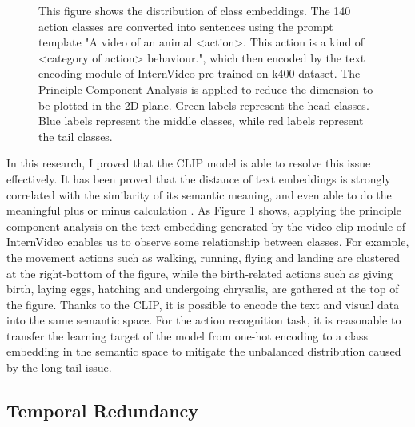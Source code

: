\begin{figure}[ht]
    \centering
    \caption[Class Embedding Distribution]{This figure shows the distribution of class embeddings. The 140 action classes are converted into sentences using the prompt template "A video of an animal <action>. This action is a kind of <category of action> behaviour.", which then encoded by the text encoding module of InternVideo \parencite{wang2022internvideo} pre-trained on k400 dataset. The Principle Component Analysis is applied to reduce the dimension to be plotted in the 2D plane. Green labels represent the head classes. Blue labels represent the middle classes, while red labels represent the tail classes.}
    \label{fig:1_1_ClassEmbeddingInternVideo}
\end{figure}



In this research, I proved that the CLIP model is able to resolve this issue effectively. It has been proved that the distance of text embeddings is strongly correlated with the similarity of its semantic meaning, and even able to do the meaningful plus or minus calculation \parencite{mikolov2013efficient}. As Figure \ref{fig:1_1_ClassEmbeddingInternVideo} shows, applying the principle component analysis on the text embedding generated by the video clip module of InternVideo \parencite{wang2022internvideo} enables us to observe some relationship between classes. For example, the movement actions such as walking, running, flying and landing are clustered at the right-bottom of the figure, while the birth-related actions such as giving birth, laying eggs, hatching and undergoing chrysalis, are gathered at the top of the figure. Thanks to the CLIP, it is possible to encode the text and visual data into the same semantic space. For the action recognition task, it is reasonable to transfer the learning target of the model from one-hot encoding to a class embedding in the semantic space \parencite{ma2022x} to mitigate the unbalanced distribution caused by the long-tail issue. 

\subsection{Temporal Redundancy}

